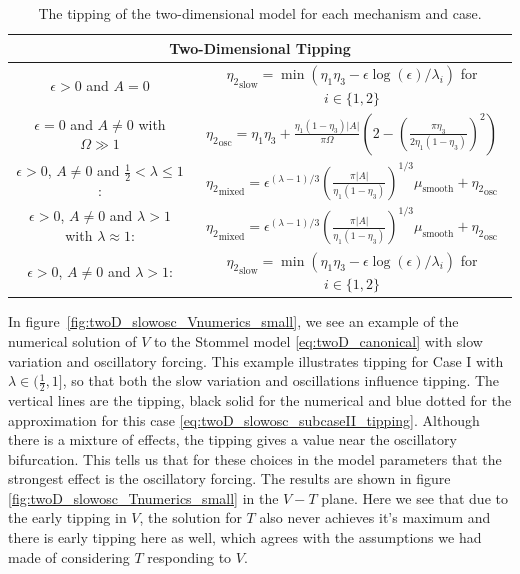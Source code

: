 \begin{table}[H]
\begin{center}
\begin{tabular}{|c|c|}
\hline 
 \multicolumn{2}{|c|}{Two-Dimensional Tipping} \\ 
\hline
$\epsilon>0$ and $A=0$ & ${\eta_2}_{\text{slow}}=\min(\eta_1\eta_3 -\epsilon\log(\epsilon)/\lambda_i)$ for $i\in\{1,2\}$ \\ 
\hline 
$\epsilon=0$ and $A\not=0$ with $\Omega\gg 1$ & ${\eta_2}_{\text{osc}}=\eta_1\eta_3+\frac{\eta_1(1-\eta_3)|A|}{\pi\Omega}\left(2-\left(\frac{\pi\eta_3}{2\eta_1(1-\eta_3)}\right)^2\right)$ \\ 
\hline 
$\epsilon>0$, $A\not=0$ and $\frac{1}{2}<\lambda\le 1$: & ${\eta_2}_{\text{mixed}}=\epsilon^{(\lambda-1)/3}\left(\frac{\pi |A|}{\eta_1(1-\eta_3)}\right)^{1/3} \mu_{\text{smooth}}+{\eta_2}_{\text{osc}}$ \\ 
\hline 
$\epsilon>0$, $A\not=0$ and $\lambda >1$ with $\lambda \approx 1$: &${\eta_2}_{\text{mixed}}=\epsilon^{(\lambda-1)/3}\left(\frac{\pi |A|}{\eta_1(1-\eta_3)}\right)^{1/3} \mu_{\text{smooth}}+{\eta_2}_{\text{osc}}$ \\ 
\hline 
$\epsilon>0$, $A\not=0$ and $\lambda>1$:
 & ${\eta_2}_{\text{slow}}=\min(\eta_1\eta_3 -\epsilon\log(\epsilon)/\lambda_i)$ for $i\in\{1,2\}$ \\
\hline
\end{tabular} 
\caption{The tipping of the two-dimensional model for each mechanism and case.}
\end{center}
\end{table}

In figure~\ref{fig:twoD_slowosc_Vnumerics_small}, we see an example of the numerical solution of $V$ to the Stommel model \eqref{eq:twoD_canonical} with slow variation and oscillatory forcing. This example illustrates tipping for Case I with $\lambda\in (\frac{1}{2},1]$, so that both the slow variation and oscillations influence tipping. The vertical lines are the tipping, black solid for the numerical and blue dotted for the approximation for this case \eqref{eq:twoD_slowosc_subcaseII_tipping}. Although there is a mixture of effects, the tipping gives a value near the oscillatory bifurcation. This tells us that for these choices in the model parameters that the strongest effect is the oscillatory forcing. The results are shown in figure \eqref{fig:twoD_slowosc_Tnumerics_small} in the $V-T$ plane. Here we see that due to the early tipping in $V$, the solution for $T$ also never achieves it's maximum and there is early tipping here as well, which agrees with the assumptions we had made of considering $T$ responding to $V$.

